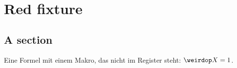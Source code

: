 \chapter{Red fixture}\label{c98}

\section{A section}\label{c98.s1}

Eine Formel mit einem Makro, das nicht im Register steht: $\weirdop X = 1$.
